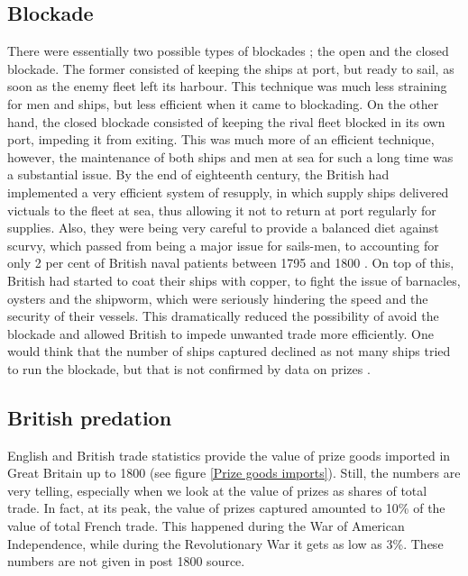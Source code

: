 \documentclass[12pt,a4paper,notitlepage,english]{article}
\begin{document}
\begin{appendix}
\subsection{Blockade}\label{app:appendix_blockade}
There were essentially two possible types of blockades \citep{Corbett2004}; the open and the closed blockade. The former consisted of keeping the ships at port, but ready to sail, as soon as the enemy fleet left its harbour. This technique was much less straining for men and ships, but less efficient when it came to blockading. On the other hand, the closed blockade consisted of keeping the rival fleet blocked in its own port, impeding it from exiting. This was much more of an efficient technique, however, the maintenance of both ships and men at sea for such a long time was a substantial issue.
By the end of eighteenth century, the British had implemented a very efficient system of resupply, in which supply ships delivered victuals to the fleet at sea, thus allowing it not to return at port regularly for supplies. 
Also, they were being very careful to provide a balanced diet against scurvy, which passed from being a major issue for sails-men, to accounting for only 2 per cent of British naval patients between 1795 and 1800 \citep{Rodger2005}. On top of this, British had started to coat their ships with copper, to fight the issue of barnacles, oysters and the shipworm, which were seriously hindering the speed and the security of their vessels. This dramatically reduced the possibility of avoid the blockade and allowed British to impede unwanted trade more efficiently.
One would think that the number of ships captured declined as not many ships tried to run the blockade, but that is not confirmed by data on prizes \cite{Benjamin2009}.

\subsection{British predation}\label{app:appendix_British_predation}

English and British trade statistics provide the value of prize goods imported in Great Britain up to 1800 (see figure \ref{Prize goods imports}).
Still, the numbers are very telling, especially when we look at the value of prizes as shares of total trade.
In fact, at its peak, the value of prizes captured amounted to 10\% of the value of total French trade.
This happened during the War of American Independence, while during the Revolutionary War it gets as low as 3\%.
These numbers are not given in post 1800 source.


\end{appendix}
\end{document}

